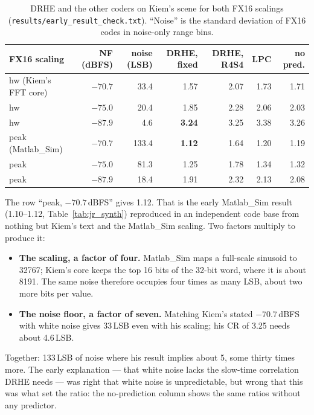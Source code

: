 \begin{table}[htbp]
\centering
\caption[FX16 scaling and noise floor]{DRHE and the other coders on Kiem's
scene for both FX16 scalings (\texttt{results/early\_result\_check.txt}).
``Noise'' is the standard deviation of FX16 codes in noise-only range bins.}
\label{tab:kr_early}
\small
\begin{tabular}{@{}lrrrrrr@{}}
\toprule
FX16 scaling & NF (dBFS) & noise (LSB) & DRHE, fixed & DRHE, R4S4 & LPC & no pred.\\
\midrule
hw (Kiem's FFT core) & $-70.7$ & 33.4 & 1.57 & 2.07 & 1.73 & 1.71\\
hw                   & $-75.0$ & 20.4 & 1.85 & 2.28 & 2.06 & 2.03\\
hw                   & $-87.9$ & 4.6  & \textbf{3.24} & 3.25 & 3.38 & 3.26\\
peak (Matlab\_Sim)   & $-70.7$ & 133.4 & \textbf{1.12} & 1.64 & 1.20 & 1.19\\
peak                 & $-75.0$ & 81.3 & 1.25 & 1.78 & 1.34 & 1.32\\
peak                 & $-87.9$ & 18.4 & 1.91 & 2.32 & 2.13 & 2.08\\
\bottomrule
\end{tabular}
\end{table}

\noindent
The row ``peak, $-70.7$\,dBFS'' gives 1.12. That is the early Matlab\_Sim
result (1.10--1.12, Table~\ref{tab:jr_synth}) reproduced in an independent code
base from nothing but Kiem's text and the Matlab\_Sim scaling. Two factors
multiply to produce it:

\begin{itemize}
\item \textbf{The scaling, a factor of four.} Matlab\_Sim maps a full-scale
sinusoid to 32767; Kiem's core keeps the top 16 bits of the 32-bit word, where
it is about 8191. The same noise therefore occupies four times as many LSB,
about two more bits per value.
\item \textbf{The noise floor, a factor of seven.} Matching Kiem's stated
$-70.7$\,dBFS with white noise gives 33\,LSB even with his scaling; his CR of
3.25 needs about 4.6\,LSB.
\end{itemize}

\noindent
Together: 133\,LSB of noise where his result implies about 5, some thirty times
more. The early explanation --- that white noise lacks the slow-time
correlation DRHE needs --- was right that white noise is unpredictable, but
wrong that this was what set the ratio: the no-prediction column shows the same
ratios without any predictor.

